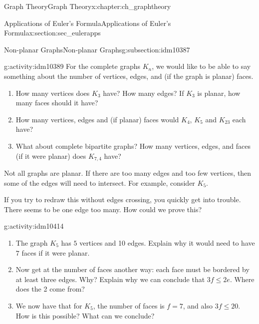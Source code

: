 \documentclass[oneside,10pt,]{book}
\numberwithin{equation}{chapter}
\newcommand{\vtx}[2]{node[fill,circle,inner sep=0pt, minimum size=4pt,label=#1:#2]{}}
\renewcommand{\v}{\vtx{above}{}}
\begin{document}
\begin{chapterptx}{Graph Theory}{}{Graph Theory}{}{}{x:chapter:ch_graphtheory}
\begin{sectionptx}{Applications of Euler's Formula}{}{Applications of Euler's Formula}{}{}{x:section:sec_eulerapps}
\begin{subsectionptx}{Non-planar Graphs}{}{Non-planar Graphs}{}{}{g:subsection:idm10387}
\begin{activity}{}{g:activity:idm10389}%
For the complete graphs \(K_n\), we would like to be able to say something about the number of vertices, edges, and (if the graph is planar) faces.%
\begin{enumerate}[font=\bfseries,label=(\alph*),ref=\alph*]
\item{}How many vertices does \(K_3\) have? How many edges?  If \(K_3\) is planar, how many faces should it have?%
\item{}How many vertices, edges and (if planar) faces would \(K_4\), \(K_5\) and \(K_{23}\) each have?%
\item{}What about complete bipartite graphs? How many vertices, edges, and faces (if it were planar) does \(K_{7,4}\) have?%
\end{enumerate}
\end{activity}
Not all graphs are planar. If there are too many edges and too few vertices, then some of the edges will need to intersect. For example, consider \(K_5\).%
\begin{sidebyside}{1}{0.4}{0.4}{0}%
\begin{sbspanel}{0.2}%
\resizebox{\linewidth}{!}{%
\begin{tikzpicture}
          \foreach \x in {0,...,4}
          \draw (\x*72+18:1) \v -- (\x*72+90:1) -- (\x*72-54:1);
        \end{tikzpicture}
}%
\end{sbspanel}%
\end{sidebyside}%
\par
If you try to redraw this without edges crossing, you quickly get into trouble. There seems to be one edge too many. How could we prove this?%
\begin{activity}{}{g:activity:idm10414}%
\begin{enumerate}[font=\bfseries,label=(\alph*),ref=\alph*]
\item{}The graph \(K_5\) has \(5\) vertices and 10 edges.  Explain why it would need to have \(7\) faces if it were planar.%
\item{}Now get at the number of faces another way: each face must be bordered by at least three edges.  Why?  Explain why we can conclude that \(3f \le 2e\).  Where does the 2 come from?%
\item{}We now have that for \(K_5\), the number of faces is \(f = 7\), and also \(3f \le 20\).  How is this possible?  What can we conclude?%
\end{enumerate}
\end{activity}

\end{subsectionptx}
\end{sectionptx}
\end{chapterptx}
\end{document}
